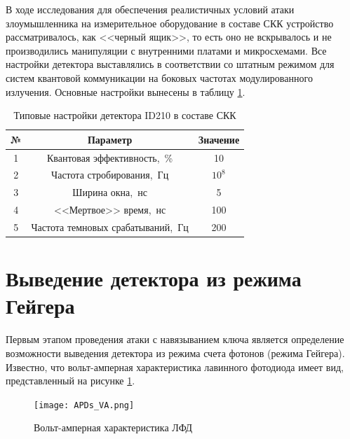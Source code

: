 В ходе исследования для обеспечения реалистичных условий атаки злоумышленника на измерительное оборудование в составе СКК устройство рассматривалось, как <<черный ящик>>, то есть оно не вскрывалось и не производились манипуляции с внутренними платами и микросхемами. Все настройки детектора выставлялись в соответствии со штатным режимом для систем квантовой коммуникации на боковых частотах модулированного излучения. Основные настройки вынесены в таблицу \ref{tab:ID210_setups}.  




\begin{table} 
	\centering
	\caption{Типовые настройки детектора ID210 в составе СКК}
	\label{tab:ID210_setups}
		\begin{tabular}{|c|c|c|}
			\hline
				№  				& Параметр    				 & Значение     \\
			\hline
				1 				& Квантовая эффективность,~\% 	 & 10 		 \\
			\hline 

				2 				& Частота стробирования,~Гц 		 & $10^8$   \\
			\hline

				3 				& Ширина окна,~нс & 5 	     \\
			\hline

				4 				& <<Мертвое>> время,~нс  & 100 		  \\
			\hline

				5 				& Частота темновых срабатываний,~Гц & 200 		  \\

			\hline
		\end{tabular}
\end{table}





\section{Выведение детектора из режима Гейгера} \label{sec:ch2/sec2}

Первым этапом проведения атаки с навязыванием ключа является определение возможности выведения детектора из режима счета фотонов (режима Гейгера). Известно, что вольт-амперная характеристика лавинного фотодиода имеет вид, представленный на рисунке \ref{fig:APDs_VA}.    

 \begin{figure}[ht]
  \centering
  \texttt{[image: APDs\_VA.png]}
  \caption{Вольт-амперная характеристика ЛФД}
  \label{fig:APDs_VA}
\end{figure}


